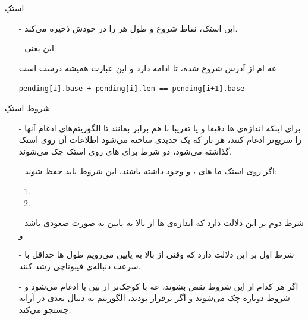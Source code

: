 \begin{frame}{استکِ }
\begin{itemize}\itemr
\item[-]
این استک، نقاط شروع و طول هر  را در خودش ذخیره می‌کند.

\item[-]
این یعنی:

 عه
ام
از آدرس
شروع شده،
تا ادامه دارد و این عبارت همیشه درست است:
\begin{latin}
\begin{flushleft}
\texttt{pending[i].base + pending[i].len == pending[i+1].base}
\end{flushleft}
\end{latin}
\end{itemize}
\end{frame}

\begin{frame}{شروط استکِ }
\begin{itemize}\itemr
\item[-]
برای اینکه اندازه‌ی ها دقیقا و یا تقریبا با هم برابر بمانند تا الگوریتم‌های ادغام آنها را سریع‌تر ادغام کنند، هر بار که یک  جدیدی ساخته می‌شود اطلاعات آن روی استک گذاشته می‌شود، دو شرط برای های روی استک چک می‌شوند.

\item[-]
اگر روی استک ما 
های
،
 و
وجود داشته باشند، این شروط باید حفظ شوند:
\begin{enumerate}\itemr
\item 
{}
\item 
{}
\end{enumerate}
\vspace{-18pt}
\item[-]
شرط دوم بر این دلالت دارد که اندازه‌ی 
ها
از بالا به پایین به صورت صعودی باشد و

\item[-]
شرط اول بر این دلالت دارد که وقتی از بالا به پایین می‌رویم طول ها حداقل با سرعت دنباله‌ی فیبوناچی رشد کنند.
\item[-]
اگر هر کدام از این شروط نقض بشوند، 
 عه
با  کوچک‌تر از بین 
یا 
ادغام می‌شود و شروط دوباره چک می‌شوند و اگر برقرار بودند، الگوریتم به دنبال 
بعدی در آرایه جستجو می‌کند.
\end{itemize}
\end{frame}

